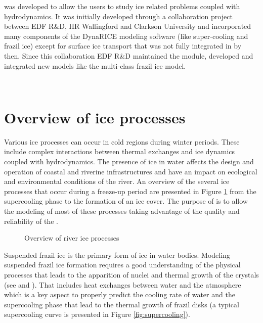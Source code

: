 \khione was developed to allow the users to study ice related problems coupled with hydrodynamics.
It was initially developed through a collaboration project between EDF R\&D, HR Wallingford and Clarkson University and
incorporated many components of the DynaRICE modeling software (like super-cooling and frazil ice) except for
surface ice transport that was not fully integrated in \khione by then.
Since this collaboration EDF R\&D maintained the module, developed and integrated new models like the multi-class frazil ice model.

~\newline
\section{Overview of ice processes}

Various ice processes can occur in cold regions during winter periods. These include complex interactions between thermal exchanges and ice dynamics coupled with hydrodynamics. The presence of ice in water affects the design and operation of coastal and riverine infrastructures and have an impact on ecological and environmental conditions of the river.
An overview of the several ice processes that occur during a freeze-up period are
presented in Figure \ref{fig:river_ice_processes_schematic} from the supercooling phase
to the formation of an ice cover. The purpose of \khione is to allow the modeling
of most of these processes taking advantage of the quality and reliability of the \telemacsystem{}.

\begin{figure}[H]
    \begin{center}
    \end{center}
    \caption{Overview of river ice processes}
    \label{fig:river_ice_processes_schematic}
\end{figure}

Suspended frazil ice is the primary form of ice in water bodies.
Modeling suspended frazil ice formation requires a good understanding of
the physical processes that leads to the apparition of nuclei and thermal growth of the crystals
(see \cite{daly_1984} and \cite{daly_1994}).
That includes heat exchanges between water and the atmosphere which is a key aspect to properly
predict the cooling rate of water and the supercooling phase that lead to the thermal growth
of frazil disks (a typical supercooling curve is presented in Figure \ref{fig:supercooling}).

